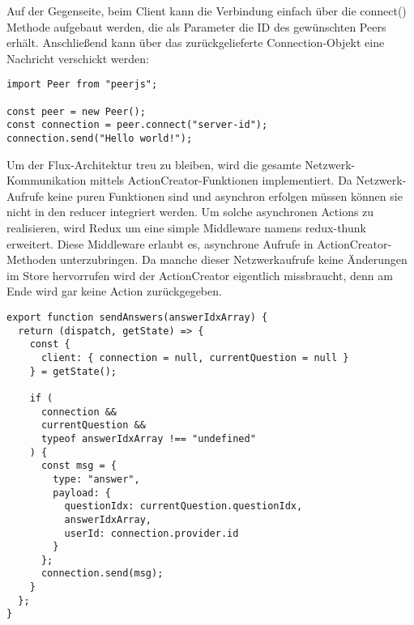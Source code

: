 Auf der Gegenseite, beim Client kann die Verbindung einfach über die connect() Methode aufgebaut werden, die als Parameter die ID des gewünschten Peers erhält. Anschließend kann über das zurückgelieferte Connection-Objekt eine Nachricht verschickt werden:

\begin{minipage}{\linewidth}
\begin{lstlisting}[caption={Verbindungsaufbau mit der PeerJS-Bibliothek auf der Client-Seite. (aus: src/client/actions/client.js)}]
import Peer from "peerjs";

const peer = new Peer();
const connection = peer.connect("server-id");
connection.send("Hello world!");
\end{lstlisting}
\end{minipage}

Um der Flux-Architektur treu zu bleiben, wird die gesamte Netzwerk-Kommunikation mittels ActionCreator-Funktionen implementiert. Da Netzwerk-Aufrufe keine puren Funktionen sind und asynchron erfolgen müssen können sie nicht in den reducer integriert werden. Um solche asynchronen Actions zu realisieren, wird Redux um eine simple Middleware namens redux-thunk\cite{web:redux_thunk} erweitert. Diese Middleware erlaubt es, asynchrone Aufrufe in ActionCreator-Methoden unterzubringen. Da manche dieser Netzwerkaufrufe keine Änderungen im Store hervorrufen wird der ActionCreator eigentlich missbraucht, denn am Ende wird gar keine Action zurückgegeben.

\begin{minipage}{\linewidth}
\begin{lstlisting}[caption={ActionCreator zum Versenden von Antworten vom Client zum Server. (aus: src/client/actions/client.js)}]
export function sendAnswers(answerIdxArray) {
  return (dispatch, getState) => {
    const {
      client: { connection = null, currentQuestion = null }
    } = getState();

    if (
      connection &&
      currentQuestion &&
      typeof answerIdxArray !== "undefined"
    ) {
      const msg = {
        type: "answer",
        payload: {
          questionIdx: currentQuestion.questionIdx,
          answerIdxArray,
          userId: connection.provider.id
        }
      };
      connection.send(msg);
    }
  };
}
\end{lstlisting}
\end{minipage}